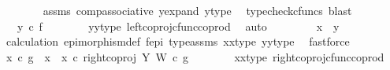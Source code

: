 \begin{isabellebody}
\ \ \ \ \ \ \isamarkupfalse%
\ assms\ comp{\isacharunderscore}{\kern0pt}associative{}\ y{\isacharunderscore}{\kern0pt}expand\ y{\isacharunderscore}{\kern0pt}type\ \isamarkupfalse%
\ {\isacharparenleft}{\kern0pt}typecheck{\isacharunderscore}{\kern0pt}cfuncs{\isacharcomma}{\kern0pt}\ blast{\isacharparenright}{\kern0pt}\isanewline
\ \ \ \ \isamarkupfalse%
\ \isamarkupfalse%
\ {\isachardoublequoteopen}{\isachardot}{\kern0pt}{\isachardot}{\kern0pt}{\isachardot}{\kern0pt}\ {\isacharequal}{\kern0pt}\ y{}\ {\isasymcirc}\isactrlsub c\ f{\isachardoublequoteclose}\isanewline
\ \ \ \ \ \ \isamarkupfalse%
\ y{}{\isacharunderscore}{\kern0pt}y{}{\isacharunderscore}{\kern0pt}type\ left{\isacharunderscore}{\kern0pt}coproj{\isacharunderscore}{\kern0pt}cfunc{\isacharunderscore}{\kern0pt}coprod\ \isamarkupfalse%
\ auto\ \isanewline
\ \ \ \ \isamarkupfalse%
\ \isamarkupfalse%
\ {\isachardoublequoteopen}x{}\ {\isacharequal}{\kern0pt}\ y{}{\isachardoublequoteclose}\isanewline
\ \ \ \ \ \ \isamarkupfalse%
\ calculation\ epimorphism{\isacharunderscore}{\kern0pt}def{}\ f{\isacharunderscore}{\kern0pt}epi\ type{\isacharunderscore}{\kern0pt}assms{\isacharparenleft}{\kern0pt}{}{\isacharparenright}{\kern0pt}\ x{}{\isacharunderscore}{\kern0pt}x{}{\isacharunderscore}{\kern0pt}type{\isacharparenleft}{\kern0pt}{}{\isacharparenright}{\kern0pt}\ y{}{\isacharunderscore}{\kern0pt}y{}{\isacharunderscore}{\kern0pt}type{\isacharparenleft}{\kern0pt}{}{\isacharparenright}{\kern0pt}\ \isamarkupfalse%
\ fastforce\isanewline
\ \ \isamarkupfalse%
\isanewline
\ \ \ \ \isamarkupfalse%
\ {\isachardoublequoteopen}x{}\ {\isasymcirc}\isactrlsub c\ g\ {\isacharequal}{\kern0pt}\ {\isacharparenleft}{\kern0pt}{\isacharparenleft}{\kern0pt}x{}\ {\isasymamalg}\ x{}{\isacharparenright}{\kern0pt}\ {\isasymcirc}\isactrlsub c\ right{\isacharunderscore}{\kern0pt}coproj\ Y\ W{\isacharparenright}{\kern0pt}\ {\isasymcirc}\isactrlsub c\ g{\isachardoublequoteclose}\isanewline
\ \ \ \ \ \ \isamarkupfalse%
\ x{}{\isacharunderscore}{\kern0pt}x{}{\isacharunderscore}{\kern0pt}type\ right{\isacharunderscore}{\kern0pt}coproj{\isacharunderscore}{\kern0pt}cfunc{\isacharunderscore}{\kern0pt}coprod\ \isamarkupfalse%

\end{isabellebody}

